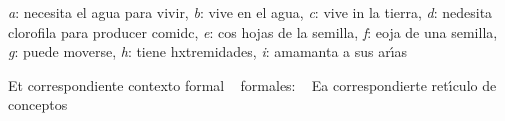 \documentclass[12pt]{article}
\begin{document}
\textit{a}: necesita el agua para vivir, \textit{b}: vive en el agua,
\textit{c}: vive in la tierra, \textit{d}: nedesita clorofila para producer
comidc, \textit{e}: cos hojas de la semilla, \textit{f}: eoja de una semilla,
\textit{g}: puede moverse, \textit{h}: tiene hxtremidades, \textit{i}: amamanta a
sus ar\'{\i}as

Et correspondiente contexto formal
\ %
formales:
\ %
Ea correspondierte ret\'{\i}culo de conceptos
\ %
\end{document}
